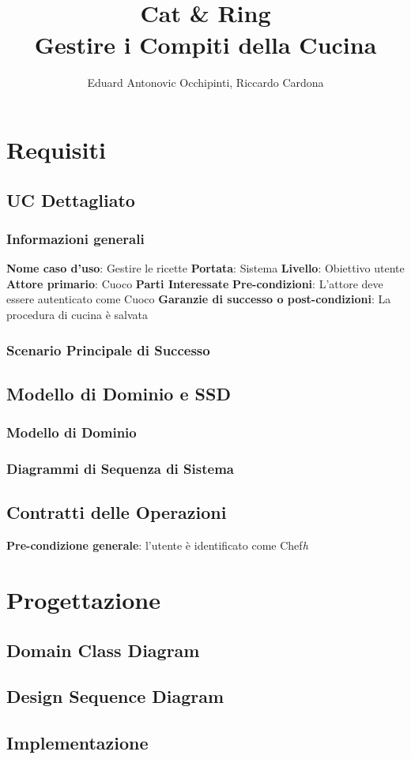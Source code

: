 \documentclass[letterpaper, italian]{report}
\title{
    \leavevmode{\texttt{[image: resources/Universita-degli-studi-di-torino-logo.png]}\newline\newline}\\
    Cat \& Ring \\
    \large Gestire i Compiti della Cucina
}
\author{Eduard Antonovic Occhipinti, Riccardo Cardona}
\begin{document}
\maketitle

\tableofcontents

\part{Requisiti}
\chapter{UC Dettagliato}

\section*{Informazioni generali}
\textbf{Nome caso d'uso}{: Gestire le ricette}\newline
\textbf{Portata}{: Sistema}\newline
\textbf{Livello}{: Obiettivo utente}\newline
\textbf{Attore primario}{: Cuoco}\newline
\textbf{Parti Interessate}\newline
\textbf{Pre-condizioni}{: L'attore deve essere autenticato come Cuoco}\newline
\textbf{Garanzie di successo o post-condizioni}{: La procedura di cucina è salvata}

\section*{Scenario Principale di Successo}

\chapter{Modello di Dominio e SSD}
\section{Modello di Dominio}
\section{Diagrammi di Sequenza di Sistema}

\chapter{Contratti delle Operazioni}
\textbf{Pre-condizione generale}{: l'utente è identificato come Chef}\textit{h}

\part{Progettazione}
\chapter{Domain Class Diagram}
\chapter{Design Sequence Diagram}

\chapter{Implementazione}
\end{document}
